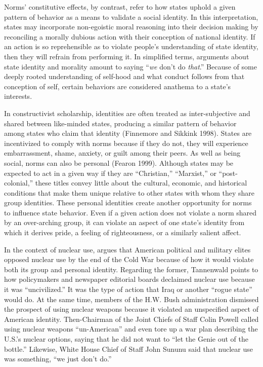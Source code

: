 \documentclass[12pt]{article}
\begin{document}
Norms' constitutive effects, by contrast, refer to how states uphold a given pattern of behavior as a means to validate a social identity. In this interpretation, states may incorporate non-egoistic moral reasoning into their decision making by reconciling a morally dubious action with their conception of national identity. If an action is so reprehensible as to violate people's understanding of state identity, then they will refrain from performing it. In simplified terms, arguments about state identity and morality amount to saying “\textit{we} don't do \textit{that}.” Because of some deeply rooted understanding of self-hood and what conduct follows from that conception of self, certain behaviors are considered anathema to a state's interests.

In constructivist scholarship, identities are often treated as inter-subjective and shared between like-minded states, producing a similar pattern of behavior among states who claim that identity (Finnemore and Sikkink 1998). States are incentivized to comply with norms because if they do not, they will experience embarrassment, shame, anxiety, or guilt among their peers. As well as being social, norms can also be personal (Fearon 1999). Although states may be expected to act in a given way if they are “Christian,” “Marxist,” or “post-colonial,” these titles convey little about the cultural, economic, and historical conditions that make them unique relative to other states with whom they share group identities. These personal identities create another opportunity for norms to influence state behavior. Even if a given action does not violate a norm shared by an over-arching group, it can violate an aspect of one state's identity from which it derives pride, a feeling of righteousness, or a similarly salient affect. 

In the context of nuclear use, \citet{tannenwald_nuclear_2007} argues that American political and military elites opposed nuclear use by the end of the Cold War because of how it would violate both its group and personal identity. Regarding the former, Tannenwald points to how policymakers and newspaper editorial boards declaimed nuclear use because it was “uncivilized.” It was the type of action that Iraq or another “rogue state” would do. At the same time, members of the H.W. Bush administration dismissed the prospect of using nuclear weapons because it violated an unspecified aspect of American identity. Then-Chairman of the Joint Chiefs of Staff Colin Powell called using nuclear weapons ``un-American'' and even tore up a war plan describing the U.S.'s nuclear options, saying that he did not want to “let the Genie out of the bottle.” Likewise, White House Chief of Staff John Sununu said that nuclear use was something, ``we just don't do.''
\end{document}
